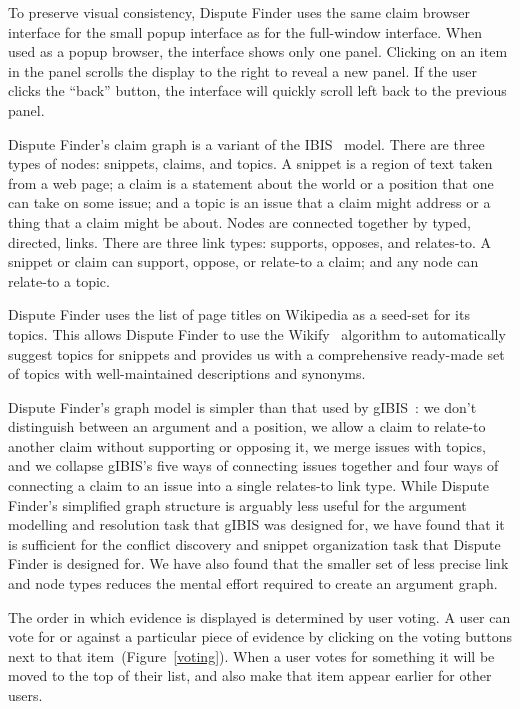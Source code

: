 \documentclass{www2010-submission}
\newcommand{\todo}[1]{}
\begin{document}
To preserve visual consistency, Dispute Finder uses the same claim browser interface for the small popup interface as for the full-window interface. When used as a popup browser, the interface shows only one panel. Clicking on an item in the panel scrolls the display to the right to reveal a new panel. If the user clicks the ``back'' button, the interface will quickly scroll left back to the previous panel.


Dispute Finder's claim graph is a variant of the IBIS~\cite{Rittel1973} model. There are three types of nodes: snippets, claims, and topics. 
A snippet is a region of text taken from a web page; a claim is a statement about the world or a position that one can take on some issue; and a topic is an issue that a claim might address or a thing that a claim might be about. Nodes are connected together by typed, directed, links. 
There are three link types: supports, opposes, and relates-to. A snippet or claim can support, oppose, or relate-to a claim; and any node can relate-to a topic. 

Dispute Finder uses the list of page titles on Wikipedia as a seed-set for its topics. This allows Dispute Finder to use the Wikify~\cite{Mihalcea2007} algorithm to automatically suggest topics for snippets and provides us with a comprehensive ready-made set of topics with well-maintained descriptions and synonyms.

Dispute Finder's graph model is simpler than that used by gIBIS~\cite{Conklin1987a}: we don't distinguish between an argument and a position, we allow a claim to relate-to another claim without supporting or opposing it, we merge issues with topics, and we collapse gIBIS's five ways of connecting issues together and four ways of connecting a claim to an issue into a single relates-to link type. 
While Dispute Finder's simplified graph structure is arguably less useful for the argument modelling and resolution task that gIBIS was designed for, we have found that it is sufficient for the conflict discovery and snippet organization task that Dispute Finder is designed for. 
We have also found that the smaller set of less precise link and node types reduces the mental effort required to create an argument graph.

The order in which evidence is displayed is determined by user voting. A user can vote for or against a particular piece of evidence by clicking on the voting buttons next to that item~(Figure~\ref{voting}). When a user votes for something it will be moved to the top of their list, and also make that item appear earlier for other users.
\end{document}
